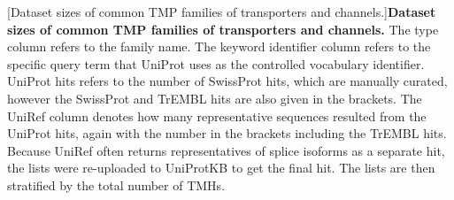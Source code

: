 \begin{table}[htbp]

  \centering
  [Dataset sizes of common TMP families of transporters and channels.]{\textbf{Dataset sizes of common TMP families of transporters and channels.}
  The type column refers to the family name.
  The keyword identifier column refers to the specific query term that UniProt uses as the controlled vocabulary identifier.
  UniProt hits refers to the number of SwissProt hits, which are manually curated, however the SwissProt and TrEMBL hits are also given in the brackets.
  The UniRef column denotes how many representative sequences resulted from the UniProt hits, again with the number in the brackets including the TrEMBL hits.
  Because UniRef often returns representatives of splice isoforms as a separate hit, the lists were re-uploaded to UniProtKB to get the final hit.
  The lists are then stratified by the total number of TMHs.
  }
\footnotesize
\begin{tabular}{lllllll}


\end{tabular}
\end{table}
